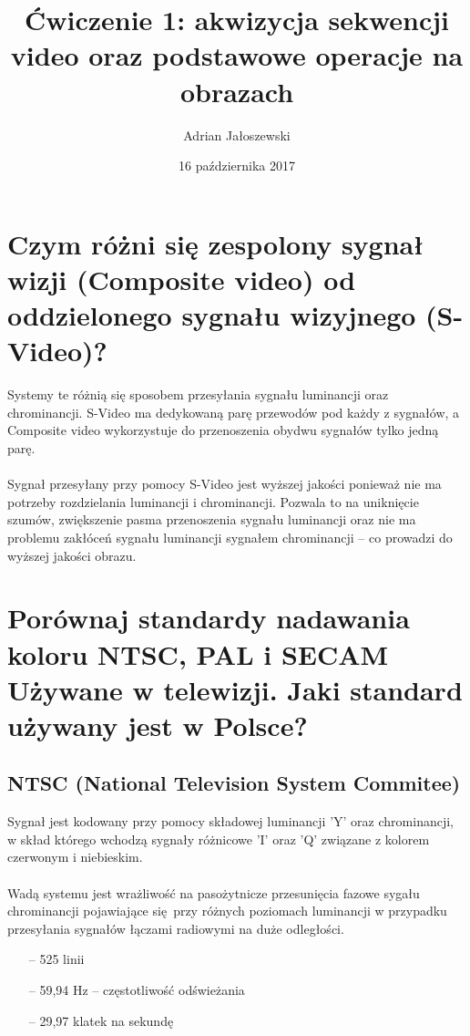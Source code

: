 \documentclass[a4paper, 12pt, titlepage]{article}
\author{Adrian Jałoszewski}
\title{Ćwiczenie 1: akwizycja sekwencji video oraz podstawowe operacje na
        obrazach}
\date{16 października 2017}
\begin{document}
    \maketitle
    \section{Czym różni się zespolony sygnał wizji (Composite video) od
        oddzielonego sygnału wizyjnego (S-Video)?}
        Systemy te różnią się sposobem przesyłania sygnału luminancji oraz
        chrominancji. S-Video ma dedykowaną parę przewodów pod każdy z
        sygnałów, a Composite video wykorzystuje do przenoszenia obydwu 
        sygnałów tylko jedną parę. 
        \\ \\ 
        Sygnał przesyłany przy pomocy S-Video jest wyższej jakości ponieważ
        nie ma potrzeby rozdzielania luminancji i chrominancji. Pozwala to
        na uniknięcie szumów, zwiększenie pasma przenoszenia sygnału luminancji
        oraz nie ma problemu zakłóceń sygnału luminancji sygnałem chrominancji
        -- co prowadzi do wyższej jakości obrazu.

    \section{Porównaj standardy nadawania koloru NTSC, PAL i SECAM Używane
        w telewizji. Jaki standard używany jest w Polsce?}
        \subsection{NTSC (National Television System Commitee)}
            Sygnał jest kodowany przy pomocy składowej luminancji 'Y' oraz
            chrominancji, w skład którego wchodzą sygnały różnicowe 'I' oraz
            'Q' związane z kolorem czerwonym i niebieskim.
            \\ \\
            Wadą systemu jest wrażliwość na pasożytnicze przesunięcia fazowe
            sygału chrominancji pojawiające się przy różnych poziomach
            luminancji w przypadku przesyłania sygnałów łączami radiowymi
            na duże odległości.
            \begin{itemize}
                \item[--] 525 linii
                \item[--] 59,94 Hz -- częstotliwość odświeżania
                \item[--] 29,97 klatek na sekundę
            \end{itemize}
\end{document}
